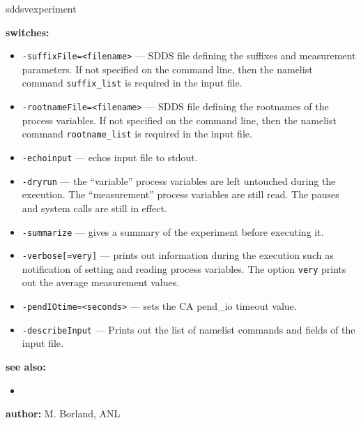 \begin{sddsprog}{sddsvexperiment}
\item \textbf{switches:}
   \begin{itemize}
   \item {\verb+-suffixFile=<filename>+} --- SDDS file defining the suffixes and measurement parameters. If not specified
               on the command line, then the namelist command {\verb+suffix_list+} is required in the input file.
   \item {\verb+-rootnameFile=<filename>+} --- SDDS file defining the rootnames of the process variables. If not specified
               on the command line, then the namelist command {\verb+rootname_list+} is required in the input file.
    \item {\verb+-echoinput+} --- echos input file to stdout.
    \item {\verb+-dryrun+} --- the ``variable'' process variables are left untouched during the execution. The ``measurement''
                process variables are still read. The pauses and system calls are still in effect.
    \item {\verb+-summarize+} --- gives a summary of the experiment before executing it.
    \item {\verb+-verbose[=very]+} --- prints out information during the execution such as notification of
                setting and reading process variables.  The option \verb+very+ prints out the average measurement values.
    \item {\verb+-pendIOtime=<seconds>+} --- sets the CA pend\_io timeout value.
    \item {\verb+-describeInput+} --- Prints out the list of namelist commands and fields of the input file.
   \end{itemize}

\item \textbf{see also:}
    \begin{itemize}
    \item {}
    \end{itemize}
\item \textbf{author:} M. Borland, ANL 
\end{sddsprog}
